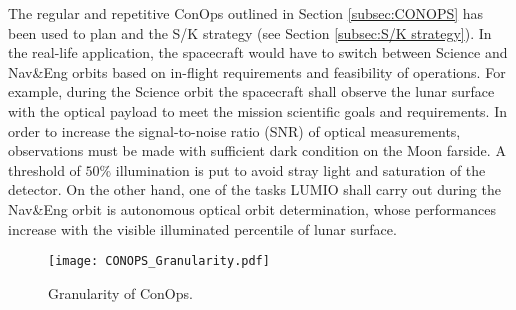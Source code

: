 The regular and repetitive ConOps outlined in Section \ref{subsec:CONOPS} has been used to plan and the S/K strategy (see Section \ref{subsec:S/K strategy}). In the real-life application, the spacecraft would have to switch between Science and Nav\&Eng orbits based on in-flight requirements and feasibility of operations. For example, during the Science orbit the spacecraft shall observe the lunar surface with the optical payload to meet the mission scientific goals and requirements. In order to increase the signal-to-noise ratio (SNR) of optical measurements, observations must be made with sufficient dark condition on the Moon farside. A threshold of $50\%$ illumination is put to avoid stray light and saturation of the detector. On the other hand, one of the tasks LUMIO shall carry out during the Nav\&Eng orbit is autonomous optical orbit determination, whose performances increase with the visible illuminated percentile of lunar surface.
%
\begin{figure*}[t!]
	\centering
	\texttt{[image: CONOPS\_Granularity.pdf]}
	\caption{Granularity of ConOps.}
	\label{fig:CONOPS_Granularity}
\end{figure*}
%

